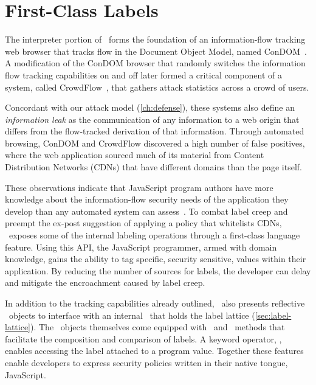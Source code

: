 
\chapter{First-Class Labels}
\label{ch:first-class-labels}

The interpreter portion of \JitFlow\ forms the foundation of an information-flow tracking web browser that tracks flow in the Document Object Model, named ConDOM~\cite{kerschbaumer.etal+12}.
A modification of the ConDOM browser that randomly switches the information flow tracking capabilities on and off later formed a critical component of a system, called CrowdFlow~\cite{kerschbaumer.etal+13}, that gathers attack statistics across a crowd of users.

Concordant with our attack model (\autoref{ch:defense}), these systems also define an \emph{information leak} as the communication of any information to a web origin that differs from the flow-tracked derivation of that information.
Through automated browsing, ConDOM and CrowdFlow discovered a high number of false positives, where the web application sourced much of its material from Content Distribution Networks (CDNs) that have different domains than the page itself.

These observations indicate that JavaScript program authors have more knowledge about the information-flow security needs of the application they develop than any automated system can assess~\cite{hennigan.etal+12, hennigan.etal+13}.
To combat label creep and preempt the ex-post suggestion of applying a policy that whitelists CDNs, \JitFlow\ exposes some of the internal labeling operations through a first-class language feature.
Using this API, the JavaScript programmer, armed with domain knowledge, gains the ability to tag specific, security sensitive, values within their application.
By reducing the number of sources for labels, the developer can delay and mitigate the encroachment caused by label creep.

In addition to the tracking capabilities already outlined, \JitFlow\ also presents reflective \FlowLabel\ objects to interface with an internal \FlowLabelRegistry\ that holds the label lattice (\autoref{sec:label-lattice}).
The \FlowLabel\ objects themselves come equipped with \mjoin\ and \msubsumes\ methods that facilitate the composition and comparison of labels.
A keyword operator, \mlabelof, enables accessing the label attached to a program value.
Together these features enable developers to express security policies written in their native tongue, JavaScript.

